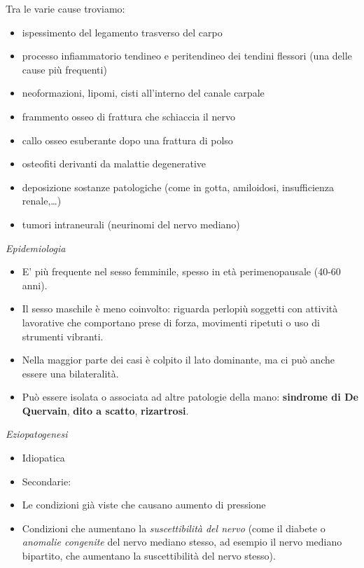 \documentclass[]{article}
\begin{document}
Tra le varie cause troviamo:

\begin{itemize}
\item
  ispessimento del legamento trasverso del carpo
\item
  processo infiammatorio tendineo e peritendineo dei tendini flessori
  (una delle cause più frequenti)
\item
  neoformazioni, lipomi, cisti all'interno del canale carpale
\item
  frammento osseo di frattura che schiaccia il nervo
\item
  callo osseo esuberante dopo una frattura di polso
\item
  osteofiti derivanti da malattie degenerative
\item
  deposizione sostanze patologiche (come in gotta, amiloidosi,
  insufficienza renale,\ldots{})
\item
  tumori intraneurali (neurinomi del nervo mediano)
\end{itemize}

\emph{Epidemiologia }

\begin{itemize}
\item
  E' più frequente nel sesso femminile, spesso in età perimenopausale
  (40-60 anni).
\item
  Il sesso maschile è meno coinvolto: riguarda perlopiù soggetti con
  attività lavorative che comportano prese di forza, movimenti ripetuti
  o uso di strumenti vibranti.
\item
  Nella maggior parte dei casi è colpito il lato dominante, ma ci può
  anche essere una bilateralità.
\item
  Può essere isolata o associata ad altre patologie della mano:
  \textbf{sindrome di De Quervain}, \textbf{dito a scatto},
  \textbf{rizartrosi}.
\end{itemize}

\emph{Eziopatogenesi }

\begin{itemize}
\item
  Idiopatica
\item
  Secondarie:
\end{itemize}

\begin{itemize}
\item
  Le condizioni già viste che causano aumento di pressione
\item
  Condizioni che aumentano la \emph{suscettibilità del nervo} (come il
  diabete o \emph{anomalie congenite} del nervo mediano stesso, ad
  esempio il nervo mediano bipartito, che aumentano la suscettibilità
  del nervo stesso).
\end{itemize}
\end{document}
